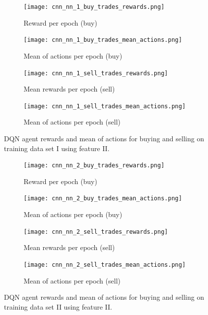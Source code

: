 \begin{figure}[H]
    \centering
    \begin{subfigure}[b]{0.4\textwidth}
        \texttt{[image: cnn\_nn\_1\_buy\_trades\_rewards.png]}
        \caption{Reward per epoch (buy)}
        \label{fig:analysis-dqn-1-trades-reward-buy}
    \end{subfigure}
    \begin{subfigure}[b]{0.4\textwidth}
        \texttt{[image: cnn\_nn\_1\_buy\_trades\_mean\_actions.png]}
        \caption{Mean of actions per epoch (buy)}
        \label{fig:analysis-dqn-1-trades-action-buy}
    \end{subfigure}
    \begin{subfigure}[b]{0.4\textwidth}
        \texttt{[image: cnn\_nn\_1\_sell\_trades\_rewards.png]}
        \caption{Mean rewards per epoch (sell)}
        \label{fig:analysis-dqn-1-trades-reward-sell}
    \end{subfigure}
    \begin{subfigure}[b]{0.4\textwidth}
        \texttt{[image: cnn\_nn\_1\_sell\_trades\_mean\_actions.png]}
        \caption{Mean of actions per epoch (sell)}
        \label{fig:analysis-dqn-1-trades-action-sell}
    \end{subfigure}
    \caption{DQN agent rewards and mean of actions for buying and selling on training data set I using feature II.}
    \label{fig:analysis-dqn-1-trades}
\end{figure}

\begin{figure}[H]
    \centering
    \begin{subfigure}[b]{0.4\textwidth}
        \texttt{[image: cnn\_nn\_2\_buy\_trades\_rewards.png]}
        \caption{Reward per epoch (buy)}
        \label{fig:analysis-dqn-2-trades-reward-buy}
    \end{subfigure}
    \begin{subfigure}[b]{0.4\textwidth}
        \texttt{[image: cnn\_nn\_2\_buy\_trades\_mean\_actions.png]}
        \caption{Mean of actions per epoch (buy)}
        \label{fig:analysis-dqn-2-trades-action-buy}
    \end{subfigure}
    \begin{subfigure}[b]{0.4\textwidth}
        \texttt{[image: cnn\_nn\_2\_sell\_trades\_rewards.png]}
        \caption{Mean rewards per epoch (sell)}
        \label{fig:analysis-dqn-2-trades-reward-sell}
    \end{subfigure}
    \begin{subfigure}[b]{0.4\textwidth}
        \texttt{[image: cnn\_nn\_2\_sell\_trades\_mean\_actions.png]}
        \caption{Mean of actions per epoch (sell)}
        \label{fig:analysis-dqn-2-trades-action-sell}
    \end{subfigure}
    \caption{DQN agent rewards and mean of actions for buying and selling on training data set II using feature II.}
    \label{fig:analysis-dqn-2-trades}
\end{figure}

